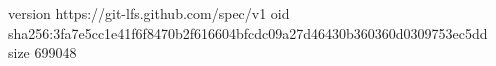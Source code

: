 version https://git-lfs.github.com/spec/v1
oid sha256:3fa7e5cc1e41f6f8470b2f616604bfcdc09a27d46430b360360d0309753ec5dd
size 699048
